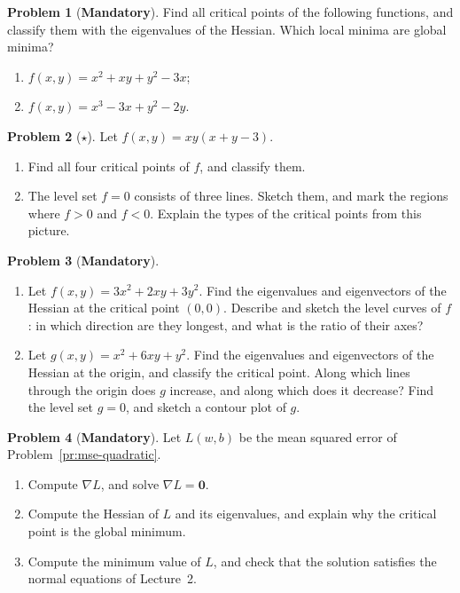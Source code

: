 \documentclass[11pt]{article}
\theoremstyle{definition}
\newtheorem{problem}{Problem}[section]
\newcommand{\mandatory}{\textcolor{red!70!black}{\textbf{Mandatory}}}
\begin{document}
\begin{problem}[\mandatory]\label{pr:classify}
    Find all critical points of the following functions, and classify them with the eigenvalues of the Hessian. Which local minima are global minima?
    \begin{enumerate}[label=(\alph*)]
        \item $f(x, y) = x^2 + xy + y^2 - 3x$;
        \item $f(x, y) = x^3 - 3x + y^2 - 2y$.
    \end{enumerate}
\end{problem}

\begin{problem}[$\star$]\label{pr:four-critical}
    Let $f(x, y) = xy(x + y - 3)$.
    \begin{enumerate}[label=(\alph*)]
        \item Find all four critical points of $f$, and classify them.
        \item The level set $f = 0$ consists of three lines. Sketch them, and mark the regions where $f > 0$ and $f < 0$. Explain the types of the critical points from this picture.
    \end{enumerate}
\end{problem}

\begin{problem}[\mandatory]\label{pr:quadratic-geometry}
    \begin{enumerate}[label=(\alph*)]
        \item Let $f(x, y) = 3x^2 + 2xy + 3y^2$. Find the eigenvalues and eigenvectors of the Hessian at the critical point $(0, 0)$. Describe and sketch the level curves of $f$: in which direction are they longest, and what is the ratio of their axes?
        \item Let $g(x, y) = x^2 + 6xy + y^2$. Find the eigenvalues and eigenvectors of the Hessian at the origin, and classify the critical point. Along which lines through the origin does $g$ increase, and along which does it decrease? Find the level set $g = 0$, and sketch a contour plot of $g$.
    \end{enumerate}
\end{problem}

\begin{problem}[\mandatory]\label{pr:ls-calculus}
    Let $L(w, b)$ be the mean squared error of Problem~\ref{pr:mse-quadratic}.
    \begin{enumerate}[label=(\alph*)]
        \item Compute $\nabla L$, and solve $\nabla L = \mathbf{0}$.
        \item Compute the Hessian of $L$ and its eigenvalues, and explain why the critical point is the global minimum.
        \item Compute the minimum value of $L$, and check that the solution satisfies the normal equations of Lecture~2.
    \end{enumerate}
\end{problem}
\end{document}
